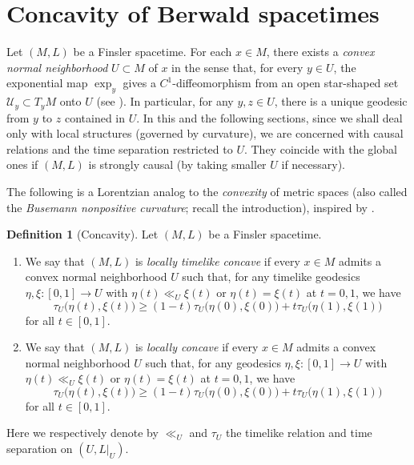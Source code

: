\documentclass[a4paper,11pt]{article}
\numberwithin{equation}{section}
\theoremstyle{definition}
\newtheorem{definition}{Definition}[section]
\theoremstyle{plain}
\newcommand{\lra}{\longrightarrow}
\begin{document}
\section{Concavity of Berwald spacetimes}\label{sc:Bconc}%

Let $(M,L)$ be a Finsler spacetime.
For each $x \in M$, there exists a \emph{convex normal neighborhood} $U \subset M$ of $x$ in the sense that, for every $y \in U$, the exponential map $\exp_y$ gives a $C^1$-diffeomorphism from an open star-shaped set $\mathcal{U}_y \subset T_yM$ onto $U$ (see \cite[Theorem~4]{Min-convex}).
In particular, for any $y,z \in U$, there is a unique geodesic from $y$ to $z$ contained in $U$.
In this and the following sections, since we shall deal only with local structures (governed by curvature), we are concerned with causal relations and the time separation restricted to $U$.
They coincide with the global ones if $(M,L)$ is strongly causal (by taking smaller $U$ if necessary).

The following is a Lorentzian analog to the \emph{convexity} of metric spaces
(also called the \emph{Busemann nonpositive curvature}; recall the introduction), inspired by \cite{BKR,EG}. 


\begin{definition}[Concavity]\label{df:conc}
Let $(M,L)$ be a Finsler spacetime.
\begin{enumerate}[(1)]
\item\label{it:ccv1}
We say that $(M,L)$ is \emph{locally timelike concave} if every $x \in M$ admits a convex normal neighborhood $U$
such that, for any timelike geodesics $\eta,\xi\colon [0,1] \lra U$ with $\eta(t) \ll_U \xi(t)$ or $\eta(t)=\xi(t)$ at $t=0,1$, we have
\[ \tau_U \bigl( \eta(t),\xi(t) \bigr) \ge (1-t)\tau_U \bigl( \eta(0),\xi(0) \bigr) +t\tau_U \bigl( \eta(1),\xi(1) \bigr) \]
for all $t \in [0,1]$.

\item\label{it:ccv2}
We say that $(M,L)$ is \emph{locally concave} if every $x \in M$ admits a convex normal neighborhood $U$
such that, for any geodesics $\eta,\xi\colon [0,1] \lra U$ with $\eta(t) \ll_U \xi(t)$ or $\eta(t) = \xi(t)$ at $t=0,1$, we have
\[ \tau_U \bigl( \eta(t),\xi(t) \bigr) \ge (1-t)\tau_U \bigl( \eta(0),\xi(0) \bigr) +t\tau_U \bigl( \eta(1),\xi(1) \bigr) \]
for all $t \in [0,1]$.
\end{enumerate}
Here we respectively denote by $\ll_U$ and $\tau_U$ the timelike relation and time separation on $(U,L|_U)$.
\end{definition}
\end{document}
